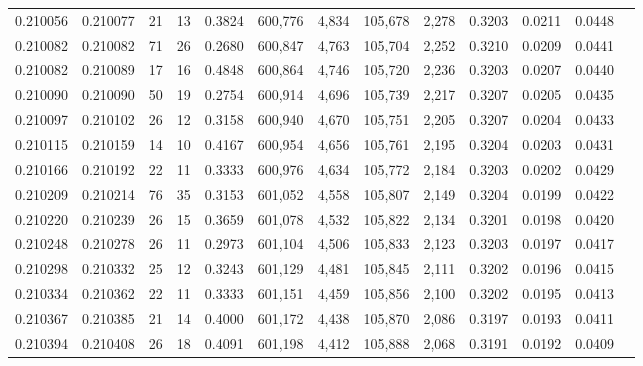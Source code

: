 \begin{tabular}{rrrrrrrrrrrrr}
0.210056 & 0.210077 &    21 &  13 &                                     0.3824 & 600,776 &   4,834 & 105,678 &   2,278 & 0.3203 & 0.0211 & 0.0448 \\
0.210082 & 0.210082 &    71 &  26 &                                     0.2680 & 600,847 &   4,763 & 105,704 &   2,252 & 0.3210 & 0.0209 & 0.0441 \\
0.210082 & 0.210089 &    17 &  16 &                                     0.4848 & 600,864 &   4,746 & 105,720 &   2,236 & 0.3203 & 0.0207 & 0.0440 \\
0.210090 & 0.210090 &    50 &  19 &                                     0.2754 & 600,914 &   4,696 & 105,739 &   2,217 & 0.3207 & 0.0205 & 0.0435 \\
0.210097 & 0.210102 &    26 &  12 &                                     0.3158 & 600,940 &   4,670 & 105,751 &   2,205 & 0.3207 & 0.0204 & 0.0433 \\
0.210115 & 0.210159 &    14 &  10 &                                     0.4167 & 600,954 &   4,656 & 105,761 &   2,195 & 0.3204 & 0.0203 & 0.0431 \\
0.210166 & 0.210192 &    22 &  11 &                                     0.3333 & 600,976 &   4,634 & 105,772 &   2,184 & 0.3203 & 0.0202 & 0.0429 \\
0.210209 & 0.210214 &    76 &  35 &                                     0.3153 & 601,052 &   4,558 & 105,807 &   2,149 & 0.3204 & 0.0199 & 0.0422 \\
0.210220 & 0.210239 &    26 &  15 &                                     0.3659 & 601,078 &   4,532 & 105,822 &   2,134 & 0.3201 & 0.0198 & 0.0420 \\
0.210248 & 0.210278 &    26 &  11 &                                     0.2973 & 601,104 &   4,506 & 105,833 &   2,123 & 0.3203 & 0.0197 & 0.0417 \\
0.210298 & 0.210332 &    25 &  12 &                                     0.3243 & 601,129 &   4,481 & 105,845 &   2,111 & 0.3202 & 0.0196 & 0.0415 \\
0.210334 & 0.210362 &    22 &  11 &                                     0.3333 & 601,151 &   4,459 & 105,856 &   2,100 & 0.3202 & 0.0195 & 0.0413 \\
0.210367 & 0.210385 &    21 &  14 &                                     0.4000 & 601,172 &   4,438 & 105,870 &   2,086 & 0.3197 & 0.0193 & 0.0411 \\
0.210394 & 0.210408 &    26 &  18 &                                     0.4091 & 601,198 &   4,412 & 105,888 &   2,068 & 0.3191 & 0.0192 & 0.0409 \\

\end{tabular}
